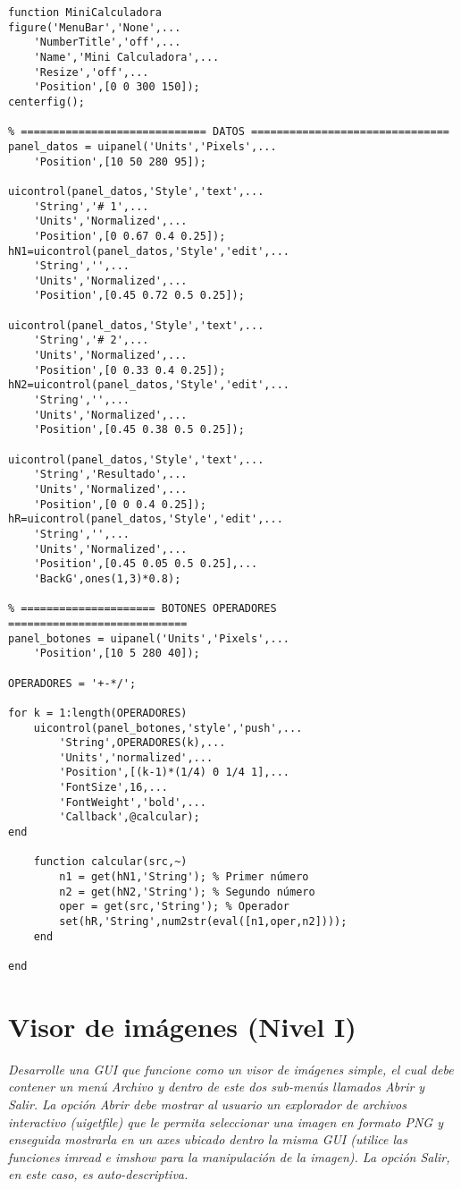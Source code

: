 \begin{verbatim}
function MiniCalculadora
figure('MenuBar','None',...
    'NumberTitle','off',...
    'Name','Mini Calculadora',...
    'Resize','off',...
    'Position',[0 0 300 150]);
centerfig();
 
% ============================= DATOS ===============================
panel_datos = uipanel('Units','Pixels',...
    'Position',[10 50 280 95]);
 
uicontrol(panel_datos,'Style','text',...
    'String','# 1',...
    'Units','Normalized',...
    'Position',[0 0.67 0.4 0.25]);
hN1=uicontrol(panel_datos,'Style','edit',...
    'String','',...
    'Units','Normalized',...
    'Position',[0.45 0.72 0.5 0.25]);
 
uicontrol(panel_datos,'Style','text',...
    'String','# 2',...
    'Units','Normalized',...
    'Position',[0 0.33 0.4 0.25]);
hN2=uicontrol(panel_datos,'Style','edit',...
    'String','',...
    'Units','Normalized',...
    'Position',[0.45 0.38 0.5 0.25]);
 
uicontrol(panel_datos,'Style','text',...
    'String','Resultado',...
    'Units','Normalized',...
    'Position',[0 0 0.4 0.25]);
hR=uicontrol(panel_datos,'Style','edit',...
    'String','',...
    'Units','Normalized',...
    'Position',[0.45 0.05 0.5 0.25],...
    'BackG',ones(1,3)*0.8);
 
% ===================== BOTONES OPERADORES ============================
panel_botones = uipanel('Units','Pixels',...
    'Position',[10 5 280 40]);
 
OPERADORES = '+-*/';
 
for k = 1:length(OPERADORES)
    uicontrol(panel_botones,'style','push',...
        'String',OPERADORES(k),...
        'Units','normalized',...
        'Position',[(k-1)*(1/4) 0 1/4 1],...
        'FontSize',16,...
        'FontWeight','bold',...
        'Callback',@calcular);
end
 
    function calcular(src,~)
        n1 = get(hN1,'String'); % Primer número
        n2 = get(hN2,'String'); % Segundo número
        oper = get(src,'String'); % Operador
        set(hR,'String',num2str(eval([n1,oper,n2])));
    end
 
end
\end{verbatim}

\section{Visor de imágenes (Nivel I)}

\textit{Desarrolle una GUI que funcione como un visor de imágenes simple, el cual debe contener un menú Archivo y dentro de este dos sub-menús llamados Abrir y Salir. La opción Abrir debe mostrar al usuario un explorador de archivos interactivo (uigetfile) que le permita seleccionar una imagen en formato PNG y enseguida mostrarla en un axes ubicado dentro la misma GUI (utilice las funciones imread e imshow para la manipulación de la imagen). La opción Salir, en este caso, es auto-descriptiva.}

